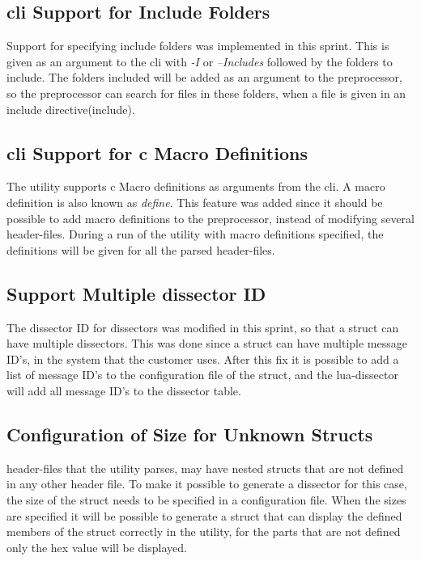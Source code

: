\subsection{\gls{cli} Support for Include Folders}
Support for specifying include folders was implemented in this sprint. This is 
given as an argument to the \gls{cli} with \emph{-I} or \emph{--Includes} followed 
by the folders to include. The folders included will be added as an argument 
to the \gls{preprocessor}, so the \gls{preprocessor} can search for files in these 
folders, when a file is given in an include directive(\gls{include}).

\subsection{\gls{cli} Support for \Gls{c} Macro Definitions}
The \gls{utility} supports \Gls{c} Macro definitions as arguments from the \gls{cli}. A macro 
definition is also known as \emph{\gls{define}}. This feature was added since it 
should be possible to add macro definitions to the \gls{preprocessor}, instead of 
modifying several \gls{header}-files. During a run of the \gls{utility} with macro 
definitions specified, the definitions will be given for all the parsed 
\gls{header}-files.

\subsection{Support Multiple \Gls{dissector} ID}
The \gls{dissector} ID for \glspl{dissector} was modified in this sprint, so that a \gls{struct} 
can have multiple \glspl{dissector}. This was done since a \gls{struct} can have multiple 
message ID's, in the system that the customer uses. After this fix it is 
possible to add a list of message ID's to the configuration file of the 
\gls{struct}, and the \Gls{lua}-\gls{dissector} will add all message ID's to the \gls{dissector} table.

\subsection{Configuration of Size for Unknown Structs}
\Gls{header}-files that the \gls{utility} parses, may have nested \glspl{struct} that are not 
defined in any other \gls{header} file. To make it possible to generate a 
\gls{dissector} for this case, the size of the \gls{struct} needs to be specified
in a configuration file. When the sizes are specified it will be possible to 
generate a \gls{struct} that can display the defined \glspl{member} of the \gls{struct} correctly 
in the \gls{utility}, for the parts that are not defined only the hex value will be 
displayed. 

